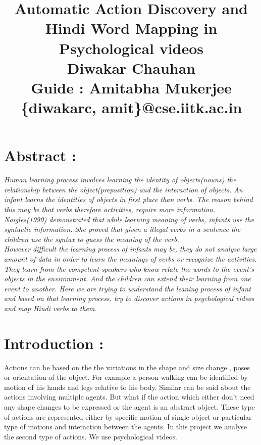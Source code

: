 \documentclass[10pt, twocolumn]{article}
\begin{document}
\title{{\bf Automatic Action Discovery and Hindi Word Mapping in Psychological videos}\\ \vspace{10pt}
			 { \normalsize {Diwakar Chauhan \\ Guide : Amitabha Mukerjee \\ \{diwakarc, amit\}@cse.iitk.ac.in}}}
\maketitle

\section*{Abstract :}
{\it
Human learning process involves learning the identity of objects(nouns) the relationship between the object(preposition) and the interaction of objects. An infant learns the identities of objects in first place than verbs. The reason behind this may be that verbs therefore activities, require more information. Naigles(1990)\cite{naigles} demonstrated that while learning meaning of verbs, infants use the syntactic information. She proved that given a illegal verbs in a sentence the children use the syntax to guess the meaning of the verb. \\
\hspace*{10pt} However difficult the learning process of infants may be, they do not analyse large amount of data in order to learn the meanings of verbs or recognize the activities. They learn from the competent speakers who know relate the words to the event's objects in the environment.\cite{kerr-cohen-08_wubble-world-lang-acquisition} And the children can extend their learning from one event to another. 
\hspace*{10pt} Here we are trying to understand the leaning process of infant and based on that learning process, try to discover actions in psychological videos and map Hindi verbs to them.
}
\section*{Introduction : }  Actions can be based on the the variations in the shape and size change , poses\cite{pami-Ben-ArieWPR02}  or orientation of the object. For example a person walking can be identified by motion of his hands and legs relative to his body. Similar can be said about the actions involving multiple agents. But what if the action which either don't need any shape changes to be expressed or the agent is an abstract object. These type of actions are represented either by specific motion of single object or particular type of motions and interaction between the agents. In this project we analyse the second type of actions. We use psychological videos\cite{fhanimation}. \\
\end{document}
